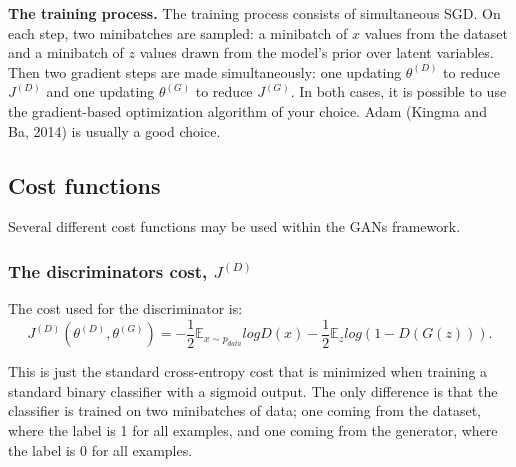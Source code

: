 \documentclass{scrartcl}
\begin{document}
\textbf{The training process.} The training process consists of simultaneous SGD. On each step, two minibatches are sampled: a minibatch of $x$ values from the
dataset and a minibatch of $z$ values drawn from the model’s prior over latent
variables. Then two gradient steps are made simultaneously: one updating $\theta^{(D)}$ to reduce $J^{(D)}$ and one updating $\theta^{(G)}$ to reduce $J^{(G)}$. In both cases, it is possible to use the gradient-based optimization algorithm of your choice. Adam (Kingma and Ba, 2014) is usually a good choice.

\subsection{Cost functions}
Several different cost functions may be used within the GANs framework.

\subsubsection{The discriminators cost, $J^{(D)}$}
The cost used for the discriminator is:
$$J^{(D)}(\theta^{(D)},\theta^{(G)}) = -\frac{1}{2} \mathbb{E}_{x \sim{} p_{data}} log D(x) - \frac{1}{2} \mathbb{E}_z log(1 - D(G(z))).$$

This is just the standard cross-entropy cost that is minimized when training
a standard binary classifier with a sigmoid output. The only difference is that the classifier is trained on two minibatches of data; one coming from the dataset, where the label is 1 for all examples, and one coming from the generator, where the label is 0 for all examples.
\end{document}
